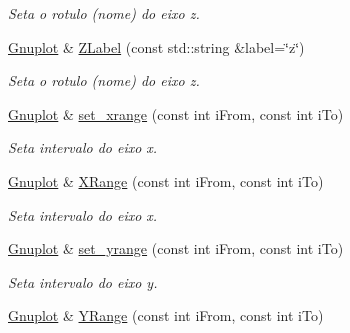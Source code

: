 \begin{DoxyCompactItemize}
\begin{DoxyCompactList}\small\item\em Seta o rotulo (nome) do eixo z. \end{DoxyCompactList}\item 
\hypertarget{classGnuplot_ace776aa2b273c0ec934e856cb28416eb}{\hyperlink{classGnuplot}{Gnuplot} \& \hyperlink{classGnuplot_ace776aa2b273c0ec934e856cb28416eb}{Z\-Label} (const std\-::string \&label=\char`\"{}z\char`\"{})}\label{classGnuplot_ace776aa2b273c0ec934e856cb28416eb}

\begin{DoxyCompactList}\small\item\em Seta o rotulo (nome) do eixo z. \end{DoxyCompactList}\item 
\hypertarget{classGnuplot_a726232ac7226b9fc8811eaefa87c902b}{\hyperlink{classGnuplot}{Gnuplot} \& \hyperlink{classGnuplot_a726232ac7226b9fc8811eaefa87c902b}{set\-\_\-xrange} (const int i\-From, const int i\-To)}\label{classGnuplot_a726232ac7226b9fc8811eaefa87c902b}

\begin{DoxyCompactList}\small\item\em Seta intervalo do eixo x. \end{DoxyCompactList}\item 
\hypertarget{classGnuplot_a3fb5c7726e954739d847edd2670705fe}{\hyperlink{classGnuplot}{Gnuplot} \& \hyperlink{classGnuplot_a3fb5c7726e954739d847edd2670705fe}{X\-Range} (const int i\-From, const int i\-To)}\label{classGnuplot_a3fb5c7726e954739d847edd2670705fe}

\begin{DoxyCompactList}\small\item\em Seta intervalo do eixo x. \end{DoxyCompactList}\item 
\hypertarget{classGnuplot_af621a43664a07523f098ffc3fb5a99b0}{\hyperlink{classGnuplot}{Gnuplot} \& \hyperlink{classGnuplot_af621a43664a07523f098ffc3fb5a99b0}{set\-\_\-yrange} (const int i\-From, const int i\-To)}\label{classGnuplot_af621a43664a07523f098ffc3fb5a99b0}

\begin{DoxyCompactList}\small\item\em Seta intervalo do eixo y. \end{DoxyCompactList}\item 
\hypertarget{classGnuplot_a266411505d17e3f85ceebd252b9e5fe9}{\hyperlink{classGnuplot}{Gnuplot} \& \hyperlink{classGnuplot_a266411505d17e3f85ceebd252b9e5fe9}{Y\-Range} (const int i\-From, const int i\-To)}\label{classGnuplot_a266411505d17e3f85ceebd252b9e5fe9}


\end{DoxyCompactItemize}
